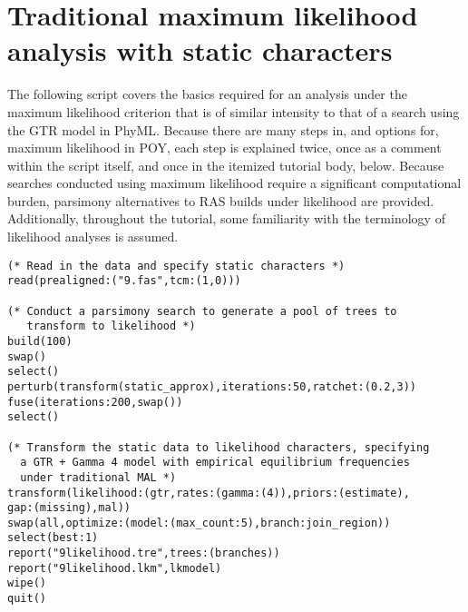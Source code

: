 \section{Traditional maximum likelihood analysis with static characters}{\label{tutorial 9}}
The following script covers the basics required for an analysis under the maximum likelihood criterion that is of 
similar intensity to that of a search using the GTR model in PhyML. Because there are many steps in, and 
options for, maximum likelihood in POY, each step is explained twice, once as a comment within the script itself, 
and once in the itemized tutorial body, below. Because searches conducted using maximum likelihood require a 
significant computational burden, parsimony alternatives to RAS builds under likelihood are provided. Additionally, 
throughout the tutorial, some familiarity with the terminology of likelihood analyses is assumed.

\begin{verbatim}
(* Read in the data and specify static characters *)
read(prealigned:("9.fas",tcm:(1,0)))

(* Conduct a parsimony search to generate a pool of trees to 
   transform to likelihood *)
build(100)
swap()
select()
perturb(transform(static_approx),iterations:50,ratchet:(0.2,3))
fuse(iterations:200,swap())
select()

(* Transform the static data to likelihood characters, specifying 
  a GTR + Gamma 4 model with empirical equilibrium frequencies 
  under traditional MAL *)
transform(likelihood:(gtr,rates:(gamma:(4)),priors:(estimate),
gap:(missing),mal))
swap(all,optimize:(model:(max_count:5),branch:join_region))
select(best:1)
report("9likelihood.tre",trees:(branches))
report("9likelihood.lkm",lkmodel)
wipe()
quit()
\end{verbatim}

